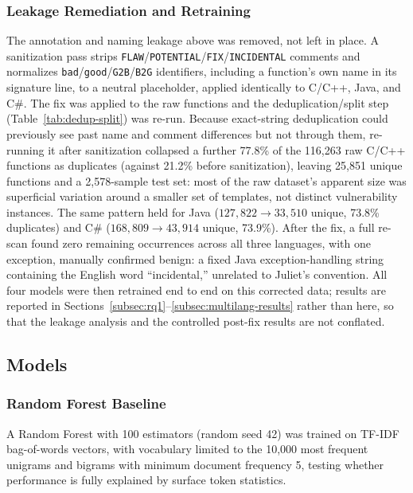 \documentclass{ieeeaccess}
\begin{document}
\subsubsection{Leakage Remediation and Retraining}
\label{par:remediation}
The annotation and naming leakage above was removed, not left in place. A sanitization pass strips \texttt{FLAW}/\texttt{POTENTIAL}/\texttt{FIX}/\texttt{INCIDENTAL} comments and normalizes \texttt{bad}/\texttt{good}/\texttt{G2B}/\texttt{B2G} identifiers, including a function's own name in its signature line, to a neutral placeholder, applied identically to C/C++, Java, and C\#. The fix was applied to the raw functions and the deduplication/split step (Table~\ref{tab:dedup-split}) was re-run. Because exact-string deduplication could previously see past name and comment differences but not through them, re-running it after sanitization collapsed a further 77.8\% of the 116{,}263 raw C/C++ functions as duplicates (against 21.2\% before sanitization), leaving 25{,}851 unique functions and a 2{,}578-sample test set: most of the raw dataset's apparent size was superficial variation around a smaller set of templates, not distinct vulnerability instances. The same pattern held for Java ($127{,}822 \rightarrow 33{,}510$ unique, 73.8\% duplicates) and C\# ($168{,}809 \rightarrow 43{,}914$ unique, 73.9\%). After the fix, a full re-scan found zero remaining occurrences across all three languages, with one exception, manually confirmed benign: a fixed Java exception-handling string containing the English word ``incidental,'' unrelated to Juliet's convention. All four models were then retrained end to end on this corrected data; results are reported in Sections~\ref{subsec:rq1}--\ref{subsec:multilang-results} rather than here, so that the leakage analysis and the controlled post-fix results are not conflated.

\subsection{Models}
\label{subsec:models}

\subsubsection{Random Forest Baseline}
A Random Forest with 100 estimators (random seed 42) was trained on TF-IDF bag-of-words vectors, with vocabulary limited to the 10{,}000 most frequent unigrams and bigrams with minimum document frequency 5, testing whether performance is fully explained by surface token statistics.
\end{document}
